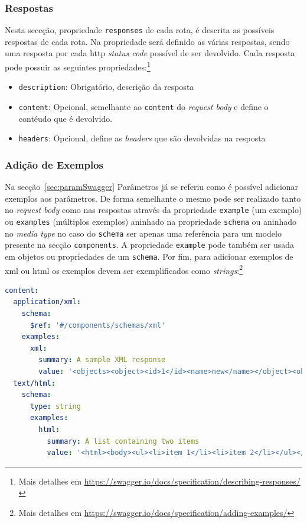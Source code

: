 \subsubsection{Respostas}
Nesta seccção, propriedade \texttt{responses} de cada rota, é descrita as possíveis respostas de cada rota. Na propriedade será definido as várias respostas, sendo uma resposta por cada \acrshort{http} \textit{status code} possível de ser devolvido. Cada resposta pode possuir as seguintes propriedades:\footnote{Mais detalhes em \url{https://swagger.io/docs/specification/describing-responses/}}
\begin{itemize}
    \item \texttt{description}: Obrigatório, descrição da resposta
    \item \texttt{content}: Opcional, semelhante ao \texttt{content} do \textit{request body} e define o contéudo que é devolvido.
    \item \texttt{headers}: Opcional, define as \textit{headers} que são devolvidas na resposta
\end{itemize}

\subsubsection{Adição de Exemplos}
Na secção~\ref{sec:paramSwagger} Parâmetros já se referiu como é possível adicionar exemplos aos parâmetros. De forma semelhante o mesmo pode ser realizado tanto no \textit{request body} como nas respostas através da propriedade \texttt{example} (um exemplo) ou \texttt{examples} (múltiplos exemplos) aninhado na propriedade \texttt{schema} ou aninhado no \textit{media type} no caso do \texttt{schema} ser apenas uma referência para um modelo presente na secção \texttt{components}. A propriedade \texttt{example} pode também ser usada em objetos ou propriedades de um \texttt{schema}. Por fim, para adicionar exemplos de \acrshort{xml} ou \acrshort{html} os exemplos devem ser exemplificados como \textit{strings}:\footnote{Mais detalhes em \url{https://swagger.io/docs/specification/adding-examples/}}
\begin{lstlisting}[language=yaml, caption=Exemplo de adição de exemplos para \acrshort{xml} e \acrshort{html} na especificação \textit{OpenAPI}]
content:
  application/xml:
    schema:
      $ref: '#/components/schemas/xml'
    examples:
      xml:
        summary: A sample XML response
        value: '<objects><object><id>1</id><name>new</name></object><object><id>2</id></object></objects>'
  text/html:
    schema:
      type: string
      examples:
        html:
          summary: A list containing two items
          value: '<html><body><ul><li>item 1</li><li>item 2</li></ul></body></html>'
\end{lstlisting}

